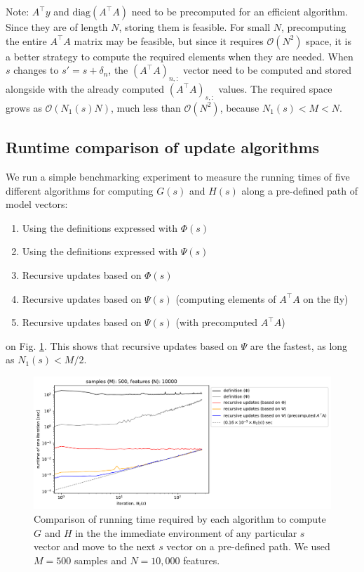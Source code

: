 \documentclass[letter,10pt,oneside]{article}
\newcommand{\+}{^\dagger}
\newcommand{\T}{^\top}
\newcommand{\reffig}[1]{Fig. \ref{#1}}
\begin{document}
Note: $A\T y$ and $\text{diag}(A\T A)$ need to be precomputed for an efficient algorithm. Since they are of length $N$, storing them is feasible. For small $N$, precomputing the entire $A\T A$ matrix may be feasible, but since it requires $\mathcal{O}(N^2)$ space, it is a better strategy to compute the required elements when they are needed. When $s$ changes to $s' = s + \delta_n$, the $(A\T A)_{n, :}$ vector need to be computed and stored alongside with the already computed $(A\T A)_{s, :}$ values. The required space grows as $\mathcal{O}(N_1(s) N)$, much less than $\mathcal{O}(N^2)$, because $N_1(s) < M < N$.

\subsection{Runtime comparison of update algorithms}
We run a simple benchmarking experiment to measure the running times of five different algorithms for computing $G(s)$ and $H(s)$ along a pre-defined path of model vectors:
\begin{enumerate}
  \item Using the definitions expressed with $\Phi(s)$
  \item Using the definitions expressed with $\Psi(s)$
  \item Recursive updates based on $\Phi(s)$
  \item Recursive updates based on $\Psi(s)$ (computing elements of $A\T A$ on the fly)
  \item Recursive updates based on $\Psi(s)$ (with precomputed $A\T A$)
\end{enumerate}
on \reffig{fig:runtimes}. This shows that recursive updates based on $\Psi$ are the fastest, as long as $N_1(s) < M/2$.

\begin{figure}[h]
  \centering
  \includegraphics[width=\textwidth]{./figs/runtimes.pdf}
  \caption{
    \label{fig:runtimes}
    Comparison of running time required by each algorithm to compute $G$ and $H$ in the the immediate environment of any particular $s$ vector and move to the next $s$ vector on a pre-defined path. We used $M = 500$ samples and $N = 10,\!000$ features.
  }
\end{figure}
\end{document}
